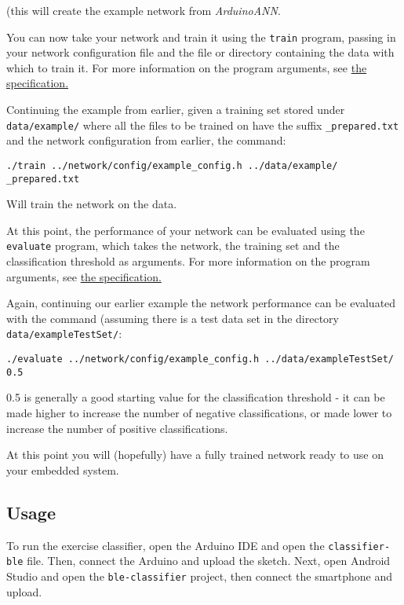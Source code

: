 \documentclass[a4paper]{article}
\begin{document}
(this will create the example network from \textit{ArduinoANN}.

You can now take your network and train it using the \lstinline{train} program, passing in your network configuration file and the file or directory containing the data with which to train it. For more information on the program arguments, see \hyperref[subsubsec:dc_csa_train]{the specification.}

Continuing the example from earlier, given a training set stored under \lstinline{data/example/} where all the files to be trained on have the suffix \lstinline{_prepared.txt} and the network configuration from earlier, the command:

\lstinline{./train ../network/config/example_config.h ../data/example/ _prepared.txt}

Will train the network on the data.

At this point, the performance of your network can be evaluated using the \lstinline{evaluate} program, which takes the network, the training set and the classification threshold as arguments. For more information on the program arguments, see \hyperref[subsubsec:dc_csa_evaluate]{the specification.}

Again, continuing our earlier example the network performance can be evaluated with the command (assuming there is a test data set in the directory \lstinline{data/exampleTestSet/}:

\lstinline{./evaluate ../network/config/example_config.h ../data/exampleTestSet/ 0.5}

0.5 is generally a good starting value for the classification threshold - it can be made higher to increase the number of negative classifications, or made lower to increase the number of positive classifications.

At this point you will (hopefully) have a fully trained network ready to use on your embedded system.

\subsection{Usage}%
\label{subsec:a1_usage}

To run the exercise classifier,  open the Arduino IDE and open the \lstinline{classifier-ble} file. Then, connect the Arduino and upload the sketch.
Next, open Android Studio and open the \lstinline{ble-classifier} project, then connect the smartphone and upload.
\end{document}

